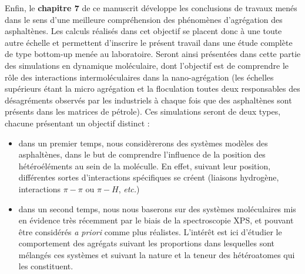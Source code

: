 	Enfin, le \textbf{chapitre 7} de ce manuscrit développe les conclusions de travaux menés dans le sens d'une meilleure compréhension des phénomènes d'agrégation des asphaltènes. Les calculs réalisés dans cet objectif se placent donc à une toute autre échelle et permettent d'inscrire le présent travail dans une étude complète de type \og bottom-up \fg menée au laboratoire. Seront ainsi présentées dans cette partie des simulations en dynamique moléculaire, dont l'objectif est de comprendre le rôle des interactions intermoléculaires dans la nano-agrégation (les échelles supérieurs étant la micro agrégation et  la floculation toutes deux responsables des désagréments observés par les industriels à chaque fois que des asphaltènes sont présents dans les matrices de pétrole). Ces simulations seront de deux types, chacune présentant un objectif distinct : 
	\begin{itemize}
	\item dans un premier temps, nous considèrerons des systèmes modèles des asphaltènes, dans le but de comprendre l'influence de la position des hétéroéléments au sein de la moléculle. En effet, suivant leur position, différentes sortes d'interactions spécifiques se créent (liaisons hydrogène, interactions $\pi-\pi$ ou $\pi-H$, \textit{etc.})
	\item dans un second temps, nous nous baserons sur des systèmes moléculaires mis en évidence très récemment par le biais de la spectroscopie XPS, et pouvant être considérés \textit{a priori} comme plus réalistes. L'intérêt est ici d'étudier le comportement des agrégats suivant les proportions dans lesquelles sont mélangés ces systèmes et suivant la nature et la teneur des hétéroatomes qui les constituent.   
	\end{itemize} 




 









 	
	
	
	
	

		
	
	
	